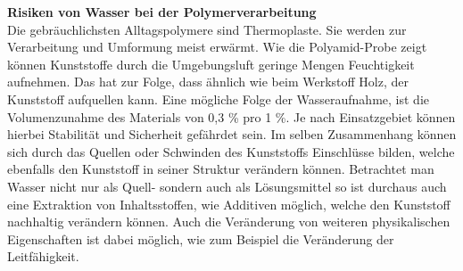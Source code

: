 \textbf{Risiken von Wasser bei der Polymerverarbeitung}\\
Die gebräuchlichsten Alltagspolymere sind Thermoplaste. Sie werden zur Verarbeitung und Umformung meist erwärmt. Wie die Polyamid-Probe zeigt können Kunststoffe durch die Umgebungsluft geringe Mengen Feuchtigkeit aufnehmen. Das hat zur Folge, dass ähnlich wie beim Werkstoff Holz, der Kunststoff aufquellen kann. Eine mögliche Folge der Wasseraufnahme, ist die  Volumenzunahme des Materials von 0,3 \% pro 1 \%.\cite{Kaiser.2006} Je nach Einsatzgebiet können hierbei Stabilität und Sicherheit gefährdet sein. Im selben Zusammenhang können sich durch das Quellen oder Schwinden des Kunststoffs Einschlüsse bilden, welche ebenfalls den Kunststoff in seiner Struktur verändern können. Betrachtet man Wasser nicht nur als Quell- sondern auch als Lösungsmittel so ist durchaus auch eine Extraktion von Inhaltsstoffen, wie Additiven möglich, welche den Kunststoff nachhaltig verändern können. Auch die Veränderung von weiteren physikalischen Eigenschaften ist dabei möglich, wie zum Beispiel die Veränderung der Leitfähigkeit.\cite{polymermerse} 